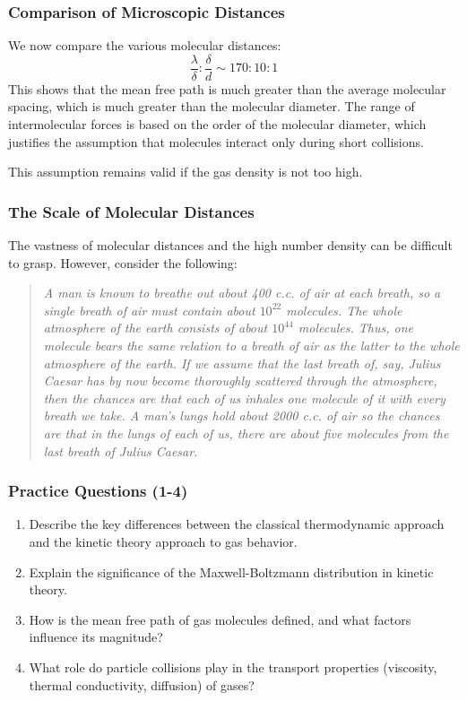 \documentclass{beamer}
\begin{document}
\begin{frame}
\frametitle{Comparison of Microscopic Distances}

We now compare the various molecular distances:
\[
\frac{\lambda}{\delta} : \frac{\delta}{d} \sim 170:10:1
\]
This shows that the mean free path is much greater than the average molecular spacing, which is much greater than the molecular diameter. The range of intermolecular forces is based on the order of the molecular diameter, which justifies the assumption that molecules interact only during short collisions.

This assumption remains valid if the gas density is not too high.
\end{frame}

\begin{frame}
\frametitle{The Scale of Molecular Distances}

The vastness of molecular distances and the high number density can be difficult to grasp. However, consider the following:\vskip0.5cm
\begin{quote}
\textit{
A man is known to breathe out about 400 c.c. of air at each breath, so a single breath of air must contain about $10^{22}$ molecules. The whole atmosphere of the earth consists of about $10^{44}$ molecules. Thus, one molecule bears the same relation to a breath of air as the latter to the whole atmosphere of the earth. If we assume that the last breath of, say, Julius Caesar has by now become thoroughly scattered through the atmosphere, then the chances are that each of us inhales one molecule of it with every breath we take. A man’s lungs hold about 2000 c.c. of air so the chances are that in the lungs of each of us, there are about five molecules from the last breath of Julius Caesar.
}
\end{quote}
\end{frame}


\begin{frame}
\frametitle{Practice Questions (1-4)}
\begin{enumerate}
    \item Describe the key differences between the classical thermodynamic approach and the kinetic theory approach to gas behavior.
    \item Explain the significance of the Maxwell-Boltzmann distribution in kinetic theory.
    \item How is the mean free path of gas molecules defined, and what factors influence its magnitude?
    \item What role do particle collisions play in the transport properties (viscosity, thermal conductivity, diffusion) of gases?
\end{enumerate}
\end{frame}
\end{document}
